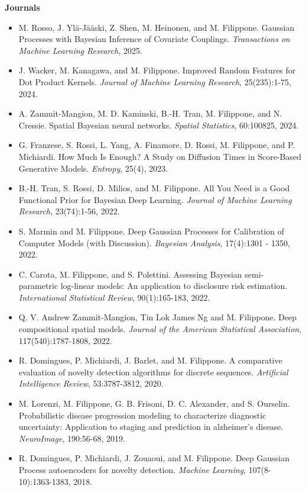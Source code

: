 \textbf{Journals}\begin{itemize}\item  M. Rosso, J. Yl\"a-J\"a\"aski, Z. Shen, M. Heinonen, and M. Filippone. Gaussian Processes with Bayesian Inference of Covariate Couplings. \emph{Transactions on Machine Learning Research}, 2025.  
\item  J. Wacker, M. Kanagawa, and M. Filippone. Improved Random Features for Dot Product Kernels. \emph{Journal of Machine Learning Research}, 25(235):1-75, 2024.  
\item  A. Zammit-Mangion, M. D. Kaminski, B.-H. Tran, M. Filippone, and N. Cressie. Spatial Bayesian neural networks. \emph{Spatial Statistics}, 60:100825, 2024.  
\item  G. Franzese, S. Rossi, L. Yang, A. Finamore, D. Rossi, M. Filippone, and P. Michiardi. How Much Is Enough? A Study on Diffusion Times in Score-Based Generative Models. \emph{Entropy}, 25(4), 2023.  
\item  B.-H. Tran, S. Rossi, D. Milios, and M. Filippone. All You Need is a Good Functional Prior for Bayesian Deep Learning. \emph{Journal of Machine Learning Research}, 23(74):1-56, 2022.  
\item  S. Marmin and M. Filippone. Deep Gaussian Processes for Calibration of Computer Models (with Discussion). \emph{Bayesian Analysis}, 17(4):1301 - 1350, 2022.  
\item  C. Carota, M. Filippone, and S. Polettini. Assessing Bayesian semi-parametric log-linear models: An application to disclosure risk estimation. \emph{International Statistical Review}, 90(1):165-183, 2022.  
\item  Q. V. Andrew Zammit-Mangion, Tin Lok James Ng and M. Filippone. Deep compositional spatial models. \emph{Journal of the American Statistical Association}, 117(540):1787-1808, 2022.  
\item  R. Domingues, P. Michiardi, J. Barlet, and M. Filippone. A comparative evaluation of novelty detection algorithms for discrete sequences. \emph{Artificial Intelligence Review}, 53:3787-3812, 2020.  
\item  M. Lorenzi, M. Filippone, G. B. Frisoni, D. C. Alexander, and S. Ourselin. Probabilistic disease progression modeling to characterize diagnostic uncertainty: Application to staging and prediction in alzheimer's disease. \emph{NeuroImage}, 190:56-68, 2019.  
\item  R. Domingues, P. Michiardi, J. Zouaoui, and M. Filippone. Deep Gaussian Process autoencoders for novelty detection. \emph{Machine Learning}, 107(8-10):1363-1383, 2018.  

\end{itemize}

